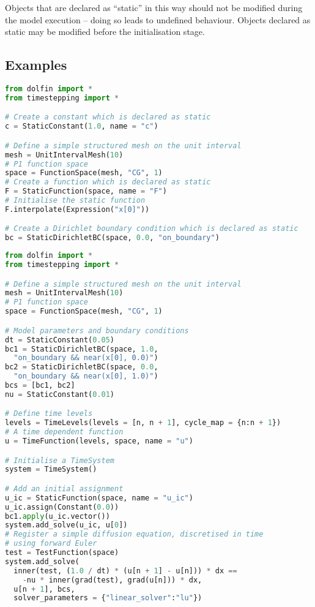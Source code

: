 \documentclass[a4paper]{book}
\begin{document}
Objects that are declared as ``static'' in this way should not be modified
during the model execution -- doing so leads to undefined behaviour. Objects
declared as static may be modified before the initialisation stage.

\subsection*{Examples}

\begin{lstlisting}[language = python, frame = single, basicstyle=\footnotesize]
from dolfin import *
from timestepping import *

# Create a constant which is declared as static
c = StaticConstant(1.0, name = "c")

# Define a simple structured mesh on the unit interval
mesh = UnitIntervalMesh(10)
# P1 function space
space = FunctionSpace(mesh, "CG", 1)
# Create a function which is declared as static
F = StaticFunction(space, name = "F")
# Initialise the static function
F.interpolate(Expression("x[0]"))

# Create a Dirichlet boundary condition which is declared as static
bc = StaticDirichletBC(space, 0.0, "on_boundary")
\end{lstlisting}

\begin{lstlisting}[language = python, frame = single, basicstyle=\footnotesize]
from dolfin import *
from timestepping import *

# Define a simple structured mesh on the unit interval
mesh = UnitIntervalMesh(10)
# P1 function space
space = FunctionSpace(mesh, "CG", 1)

# Model parameters and boundary conditions
dt = StaticConstant(0.05)
bc1 = StaticDirichletBC(space, 1.0,
  "on_boundary && near(x[0], 0.0)")
bc2 = StaticDirichletBC(space, 0.0,
  "on_boundary && near(x[0], 1.0)")
bcs = [bc1, bc2]
nu = StaticConstant(0.01)

# Define time levels
levels = TimeLevels(levels = [n, n + 1], cycle_map = {n:n + 1})
# A time dependent function
u = TimeFunction(levels, space, name = "u")

# Initialise a TimeSystem
system = TimeSystem()

# Add an initial assignment
u_ic = StaticFunction(space, name = "u_ic")
u_ic.assign(Constant(0.0))
bc1.apply(u_ic.vector())
system.add_solve(u_ic, u[0])
# Register a simple diffusion equation, discretised in time
# using forward Euler
test = TestFunction(space)
system.add_solve(
  inner(test, (1.0 / dt) * (u[n + 1] - u[n])) * dx ==
    -nu * inner(grad(test), grad(u[n])) * dx,
  u[n + 1], bcs,
  solver_parameters = {"linear_solver":"lu"})
\end{lstlisting}
\end{document}
